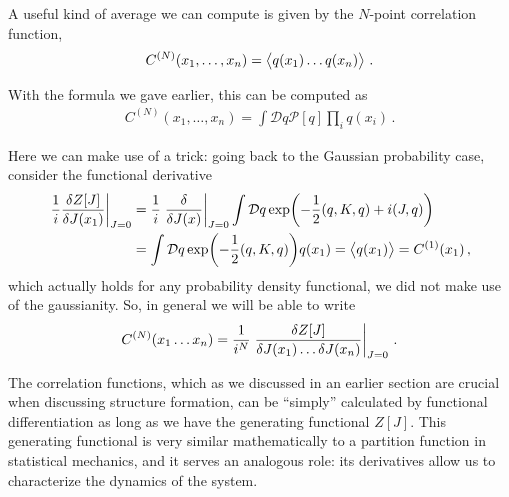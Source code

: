 \documentclass[main.tex]{subfiles}
\begin{document}
A useful kind of average we can compute is given by the \(N\)-point correlation function, 
%
\begin{align}
C^{(N)}(x_1, \dots, x_n) = \expval{q(x_1) \dots q(x_n)}
\,.
\end{align}

With the formula we gave earlier, this can be computed as 
%
\begin{align}
C^{(N)}(x_1, \dots , x_n)
= \int \mathcal{D}q \mathcal{P}[q] \prod_i q(x_i)
\,.
\end{align}

Here we can make use of a trick: going back to the Gaussian probability case, consider the functional derivative
%
\begin{align}
\eval{\frac{1}{i}\fdv{Z[J]}{J(x_1 )}}_{J = 0} &= \frac{1}{i} \eval{\fdv{}{J(x)}}_{J=0} \int \mathcal{D}q
\exp(- \frac{1}{2} (q, K, q) + i (J,q))  \\
&= \int \mathcal{D}q \exp(- \frac{1}{2} (q, K, q)) q(x_1 )
= \expval{q(x_1 )} = C^{(1)}(x_1 )
\,,
\end{align}
%
which actually holds for any probability density functional, we did not make use of the gaussianity.
So, in general we will be able to write 
%
\begin{align}
C^{(N)} (x_1 \dots x_n) = \frac{1}{i^{N}} \eval{\frac{ \delta Z[J]}{ \delta J(x_1 )\dots \delta J(x_n)}}_{J =0 }
\,.
\end{align}

The correlation functions, which as we discussed in an earlier section are crucial when discussing structure formation, can be ``simply'' calculated by functional differentiation as long as we have the generating functional \(Z[J]\).
This generating functional is very similar mathematically to a partition function in statistical mechanics, and it serves an analogous role: its derivatives allow us to characterize the dynamics of the system. 
\end{document}
